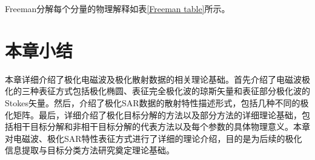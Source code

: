 Freeman分解每个分量的物理解释如表\ref{Freeman table}所示。
\begin{table}[!ht]
    \caption{Freeman分解}
    \label{Freeman table}
\end{table}

\section{本章小结}
本章详细介绍了极化电磁波及极化散射数据的相关理论基础。首先介绍了电磁波极化的三种表征方式包括极化椭圆、表征完全极化波的琼斯矢量和表征部分极化波的Stokes矢量。然后，介绍了极化SAR数据的散射特性描述形式，包括几种不同的极化矩阵。最后，详细介绍了极化目标分解的方法以及部分方法的详细理论基础，包括相干目标分解和非相干目标分解的代表方法以及每个参数的具体物理意义。本章对电磁波、极化SAR特性表征方式进行了详细的理论介绍，目的是为后续的极化信息提取与目标分类方法研究奠定理论基础。